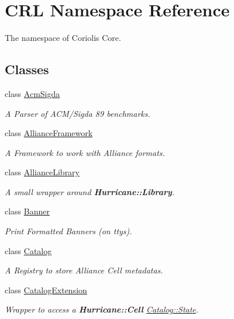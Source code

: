 \hypertarget{namespaceCRL}{}\section{C\+RL Namespace Reference}
\label{namespaceCRL}


The namespace of Coriolis Core.  


\subsection*{Classes}
\begin{DoxyCompactItemize}
\item 
class \hyperlink{classCRL_1_1AcmSigda}{Acm\+Sigda}
\begin{DoxyCompactList}\small\item\em A Parser of A\+C\+M/\+Sigda 89\textquotesingle{} benchmarks. \end{DoxyCompactList}\item 
class \hyperlink{classCRL_1_1AllianceFramework}{Alliance\+Framework}
\begin{DoxyCompactList}\small\item\em A Framework to work with Alliance formats. \end{DoxyCompactList}\item 
class \hyperlink{classCRL_1_1AllianceLibrary}{Alliance\+Library}
\begin{DoxyCompactList}\small\item\em A small wrapper around \textbf{ Hurricane\+::\+Library}. \end{DoxyCompactList}\item 
class \hyperlink{classCRL_1_1Banner}{Banner}
\begin{DoxyCompactList}\small\item\em Print Formatted Banners (on ttys). \end{DoxyCompactList}\item 
class \hyperlink{classCRL_1_1Catalog}{Catalog}
\begin{DoxyCompactList}\small\item\em A Registry to store Alliance Cell metadatas. \end{DoxyCompactList}\item 
class \hyperlink{classCRL_1_1CatalogExtension}{Catalog\+Extension}
\begin{DoxyCompactList}\small\item\em Wrapper to access a \textbf{ Hurricane\+::\+Cell} \hyperlink{classCRL_1_1Catalog_1_1State}{Catalog\+::\+State}. \end{DoxyCompactList}\item 

\end{DoxyCompactItemize}

